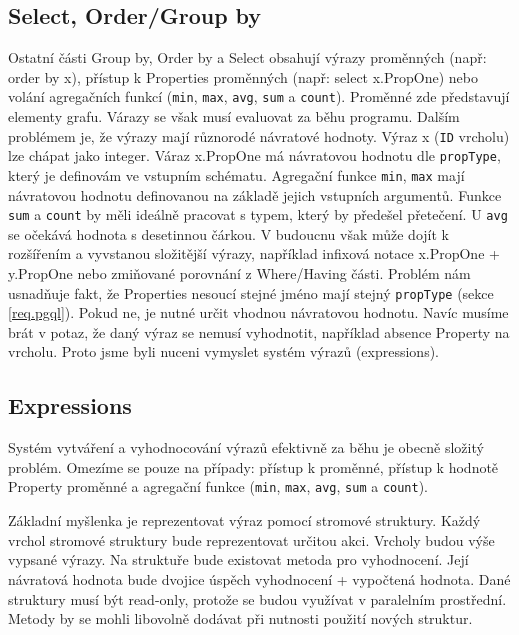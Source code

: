 \subsection{Select, Order/Group by}

Ostatní části Group by, Order by a Select obsahují výrazy proměnných (např: order by x), přístup k Properties proměnných (např: select x.PropOne) nebo volání agregačních funkcí (\verb+min+, \verb+max+, \verb+avg+, \verb+sum+ a \verb+count+).
Proměnné zde představují elementy grafu.
Várazy se však musí evaluovat za běhu programu.
Dalším problémem je, že výrazy mají různorodé návratové hodnoty.
Výraz x (\verb+ID+ vrcholu) lze chápat jako integer.
Váraz x.PropOne má návratovou hodnotu dle \verb+propType+, který je definovám ve vstupním schématu.
Agregační funkce \verb+min+, \verb+max+ mají návratovou hodnotu definovanou na základě jejich vstupních argumentů.
Funkce \verb+sum+ a \verb+count+ by měli ideálně pracovat s typem, který by předešel přetečení.
U \verb+avg+ se očekává hodnota s desetinnou čárkou.  
V budoucnu však může dojít k rozšířením a vyvstanou složitější výrazy, například infixová notace x.PropOne + y.PropOne nebo zmiňované porovnání z Where/Having části.
Problém nám usnadňuje fakt, že Properties nesoucí stejné jméno mají stejný \verb+propType+ (sekce \ref{req.pgql}).
Pokud ne, je nutné určit vhodnou návratovou hodnotu.
Navíc musíme brát v potaz, že daný výraz se nemusí vyhodnotit, například absence Property na vrcholu.
Proto jsme byli nuceni vymyslet systém výrazů (expressions).

\subsection{Expressions}

Systém vytváření a vyhodnocování výrazů efektivně za běhu je obecně složitý problém.
Omezíme se pouze na případy: přístup k proměnné, přístup k hodnotě Property proměnné a agregační funkce (\verb+min+, \verb+max+, \verb+avg+, \verb+sum+ a \verb+count+).

Základní myšlenka je reprezentovat výraz pomocí stromové struktury. 
Každý vrchol stromové struktury bude reprezentovat určitou akci.
Vrcholy budou výše vypsané výrazy. 
Na struktuře bude existovat metoda pro vyhodnocení.
Její návratová hodnota bude dvojice úspěch vyhodnocení + vypočtená hodnota. 
Dané struktury musí být read-only, protože se budou využívat v paralelním prostřední.
Metody by se mohli libovolně dodávat při nutnosti použití nových struktur. 

